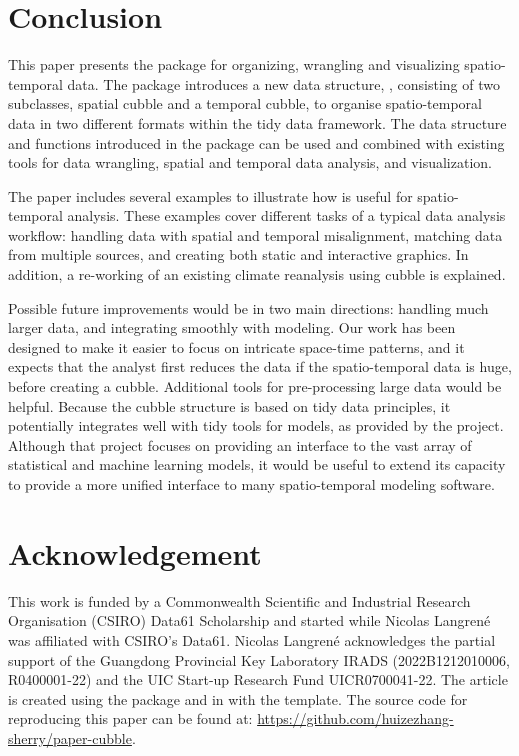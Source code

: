 \documentclass[
  shortnames]{jss}
\begin{document}
\hypertarget{conclude}{%
\section{Conclusion}\label{conclude}}

This paper presents the  package  for organizing, wrangling and visualizing spatio-temporal data. The package introduces a new data structure, , consisting of two subclasses, spatial cubble and a temporal cubble, to organise spatio-temporal data in two different formats within the tidy data framework. The data structure and functions introduced in the package can be used and combined with existing tools for data wrangling, spatial and temporal data analysis, and visualization.

The paper includes several examples to illustrate how  is useful for spatio-temporal analysis. These examples cover different tasks of a typical data analysis workflow: handling data with spatial and temporal misalignment, matching data from multiple sources, and creating both static and interactive graphics. In addition, a re-working of an existing climate reanalysis using cubble is explained.

Possible future improvements would be in two main directions: handling much larger data, and integrating smoothly with modeling. Our work has been designed to make it easier to focus on intricate space-time patterns, and it expects that the analyst first reduces the data if the spatio-temporal data is huge, before creating a cubble. Additional tools for pre-processing large data would be helpful. Because the cubble structure is based on tidy data principles, it potentially integrates well with tidy tools for models, as provided by the  project. Although that project focuses on providing an interface to the vast array of statistical and machine learning models, it would be useful to extend its capacity to provide a more unified interface to many spatio-temporal modeling software.

\hypertarget{acknowledgement}{%
\section{Acknowledgement}\label{acknowledgement}}

This work is funded by a Commonwealth Scientific and Industrial Research Organisation (CSIRO) Data61 Scholarship and started while Nicolas Langrené was affiliated with CSIRO's Data61. Nicolas Langrené acknowledges the partial support of the Guangdong Provincial Key Laboratory IRADS (2022B1212010006, R0400001-22) and the UIC Start-up Research Fund UICR0700041-22. The article is created using the package  \citep{knitr} and  \citep{rmarkdown} in  with the  template. The source code for reproducing this paper can be found at: \url{https://github.com/huizezhang-sherry/paper-cubble}.


\end{document}

